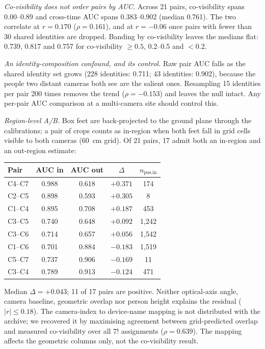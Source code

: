 \documentclass[10pt,a4paper]{article}
\begin{document}
\emph{Co-visibility does not order pairs by AUC.} Across 21 pairs, co-visibility spans 0.00--0.89 and cross-time AUC spans 0.383--0.902 (median 0.761). The two correlate at $r=0.170$ ($\rho=0.161$), and at $r=-0.06$ once pairs with fewer than 30 shared identities are dropped. Banding by co-visibility leaves the medians flat: 0.739, 0.817 and 0.757 for co-visibility $\ge0.5$, 0.2--0.5 and $<0.2$.

\emph{An identity-composition confound, and its control.} Raw pair AUC falls as the shared identity set grows (228 identities: 0.711; 43 identities: 0.902), because the people two distant cameras both see are the salient ones. Resampling 15 identities per pair 200 times removes the trend ($\rho=-0.153$) and leaves the null intact. Any per-pair AUC comparison at a multi-camera site should control this.

\emph{Region-level A/B.} Box feet are back-projected to the ground plane through the calibrations; a pair of crops counts as in-region when both feet fall in grid cells visible to both cameras (60~cm grid). Of 21 pairs, 17 admit both an in-region and an out-region estimate:

\begin{center}
\small
\setlength{\tabcolsep}{5pt}
\begin{tabular}{@{}lcccc@{}}
\toprule
Pair & AUC in & AUC out & $\Delta$ & $n_{\text{pos,in}}$\\
\midrule
C4--C7 & 0.988 & 0.618 & $+0.371$ & 174\\
C2--C5 & 0.898 & 0.593 & $+0.305$ & 8\\
C1--C4 & 0.895 & 0.708 & $+0.187$ & 453\\
C3--C5 & 0.740 & 0.648 & $+0.092$ & 1{,}242\\
C3--C6 & 0.714 & 0.657 & $+0.056$ & 1{,}542\\
C1--C6 & 0.701 & 0.884 & $-0.183$ & 1{,}519\\
C5--C7 & 0.737 & 0.906 & $-0.169$ & 11\\
C3--C4 & 0.789 & 0.913 & $-0.124$ & 471\\
\bottomrule
\end{tabular}
\end{center}

Median $\Delta=+0.043$; 11 of 17 pairs are positive. Neither optical-axis angle, camera baseline, geometric overlap nor person height explains the residual ($|r|\le0.18$). The camera-index to device-name mapping is not distributed with the archive; we recovered it by maximising agreement between grid-predicted overlap and measured co-visibility over all $7!$ assignments ($\rho=0.639$). The mapping affects the geometric columns only, not the co-visibility result.
\end{document}
